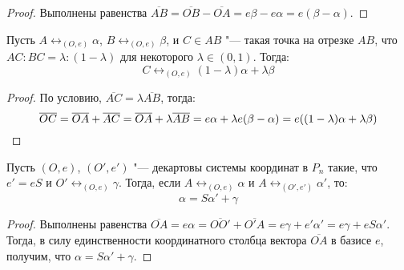 \begin{proof}
	Выполнены равенства $\overline{AB} = \overline{OB} - \overline{OA} = e\beta - e\alpha = e(\beta - \alpha)$.
\end{proof}

\begin{proposition}
	Пусть $A \leftrightarrow_{(O, e)} \alpha$, $B \leftrightarrow_{(O, e)} \beta$, и $C \in AB$ "--- такая точка на отрезке $AB$, что $AC : BC = \lambda : (1 - \lambda)$ для некоторого $\lambda \in (0, 1)$. Тогда:
	\[C \leftrightarrow_{(O, e)} (1 - \lambda) \alpha + \lambda \beta\]
\end{proposition}

\begin{proof}
	По условию, $\overline{AC} = \lambda \overline{AB}$, тогда:
	\[\overline{OC} = \overline{OA} + \overline{AC} = \overline{OA} + \lambda \overline{AB} = e\alpha + \lambda e(\beta - \alpha) = e((1 - \lambda) \alpha + \lambda \beta)\qedhere\]
\end{proof}

\begin{theorem}
	Пусть $(O, e)$, $(O', e')$ "--- декартовы системы координат в $P_n$ такие, что $e' = eS$ и $O' \leftrightarrow_{(O, e)} \gamma$. Тогда, если $A \leftrightarrow_{(O, e)} \alpha$ и $A \leftrightarrow_{(O', e')} \alpha'$, то:
	\[\alpha = S\alpha' + \gamma\]
\end{theorem}

\begin{proof}
	Выполнены равенства $\overline{OA} = e\alpha = \overline{OO'} + \overline{O'A} = e\gamma + e'\alpha' = e\gamma + eS\alpha'$. Тогда, в силу единственности координатного столбца вектора $\overline{OA}$ в базисе $e$, получим, что $\alpha =  S\alpha' + \gamma$.
\end{proof}